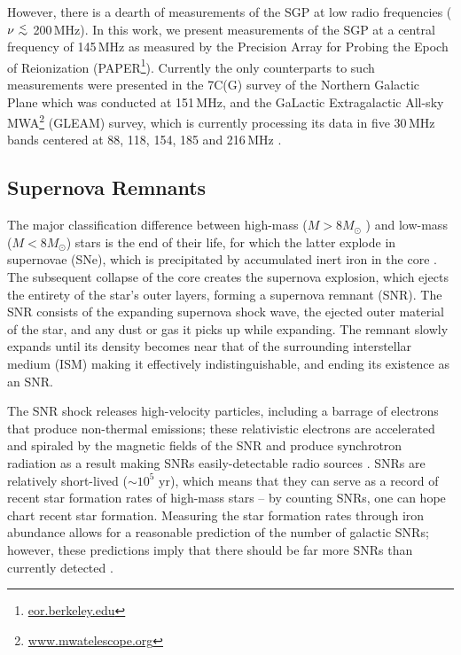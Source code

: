 \documentclass[useAMS,usenatbib]{mn2e}
\newcommand {\aplt} {\ {\raise-.5ex\hbox{$\buildrel<\over\sim$}}\ }
\begin{document}
However, there is a dearth of measurements of the SGP at low radio frequencies ($\nu\aplt$200\,MHz). In this work, we present measurements of the SGP at a central frequency of 145\,MHz as measured by the Precision Array for Probing the Epoch of Reionization (PAPER\footnote{\url{eor.berkeley.edu}}). Currently the only counterparts to such measurements were presented in the 7C(G) survey of the Northern Galactic Plane \citep{Vessey.98} which was conducted at 151\,MHz, and the GaLactic Extragalactic All-sky MWA\footnote{\url{www.mwatelescope.org}} (GLEAM) survey, which is currently processing its data in five 30\,MHz bands centered at 88, 118, 154, 185 and 216\,MHz \citep{Wayth.15}.

\subsection{Supernova Remnants}
The major classification difference between high-mass ($M > 8M_{\odot}$ ) and low-mass ($M < 8 M_\odot$) stars is the end of their life, for which the latter explode in supernovae (SNe), which is precipitated by accumulated inert iron in the core \citep{Arnett.73}.  
The subsequent collapse of the core creates the supernova explosion, which ejects the entirety of the star’s outer layers, forming a supernova remnant (SNR).  The SNR consists of the expanding supernova shock wave, the ejected outer material of the star, and any dust or gas it picks up while expanding.  
The remnant slowly expands until its density becomes near that of the surrounding interstellar medium (ISM) making it effectively indistinguishable, and ending its existence as an SNR.  

The SNR shock releases high-velocity particles, including a barrage of electrons that produce non-thermal emissions; these relativistic electrons are accelerated and spiraled by the magnetic fields of the SNR and produce synchrotron radiation as a result making SNRs easily-detectable radio sources \citep[e.g.][]{Burbidge.56,Stupar_cat.11}. 
SNRs are relatively short-lived ($\sim10^5$ yr), which means that they can serve as a record of recent star formation rates of high-mass stars -- by counting SNRs, one can hope chart recent star formation.
Measuring the star formation rates through iron abundance allows for a reasonable prediction of the number of galactic SNRs; however, these predictions imply that there should be far more SNRs than currently detected \citep[e.g.][]{Brogan.06}.  
\end{document}
